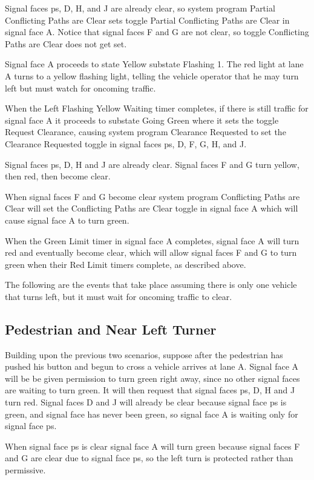 \documentclass[letterpaper,twoside]{article}
\begin{document}
Signal faces ps, D, H, and J are already clear, so system program Partial
Conflicting Paths are Clear sets toggle Partial Conflicting Paths are Clear
in signal face A.
Notice that signal faces F and G are not clear, so toggle Conflicting Paths
are Clear does not get set.

Signal face A proceeds to state Yellow substate Flashing 1.  The red light
at lane A turns to a yellow flashing light, telling the vehicle operator
that he may turn left but must watch for oncoming traffic.

When the Left Flashing Yellow Waiting timer completes, if there is still
traffic for
signal face A it proceeds to substate Going Green where it sets the
toggle Request Clearance, causing system program Clearance Requested to
set the Clearance Requested toggle in signal faces ps, D, F, G, H, and J.

Signal faces ps, D, H and J are already clear.  Signal faces F and G turn
yellow, then red, then become clear.

When signal faces F and G become clear system program Conflicting Paths
are Clear will set the Conflicting Paths are Clear toggle in signal face
A which will cause signal face A to turn green.

When the Green Limit timer in signal face A completes, signal face
A will turn red and eventually become clear, which will allow
signal faces F and G to turn green when their Red Limit timers complete,
as described above.

The following are the events that take place assuming there is only
one vehicle that turns left, but it must wait for oncoming traffic
to clear.



\subsection{Pedestrian and Near Left Turner}

Building upon the previous two scenarios, suppose after the pedestrian
has pushed his button and begun to cross a vehicle arrives at lane A.
Signal face A will be be given permission to turn green right away, since no
other signal faces are waiting to turn green.  It will then request
that signal faces ps, D, H and J turn red.  Signal faces D and J
will already be clear because signal face ps is green, and signal face
has never been green, so signal face A is waiting only for signal face ps.

When signal face ps is clear signal face A will turn green because
signal faces F and G are clear due to signal face ps, so the left turn
is protected rather than permissive.
\end{document}
